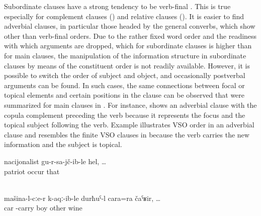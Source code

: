 Subordinate clauses have a strong tendency to be verb-final . This is true especially for complement clauses () and relative clauses (). It is easier to find adverbial clauses, in particular those headed by the general converbs, which show other than verb-final orders. Due to the rather fixed word order and the readiness with which arguments are dropped, which for subordinate clauses is higher than for main clauses, the manipulation of the information structure in subordinate clauses by means of the constituent order is not readily available. However, it is possible to switch the order of subject and object, and occasionally postverbal arguments can be found. In such cases, the same connections between focal or topical elements and certain positions in the clause can be observed that were summarized for main clauses in . For instance,  shows an adverbial clause with the copula complement preceding the verb because it represents the focus and the topical subject following the verb. Example  illustrates VSO order in an adverbial clause and resembles the finite VSO clauses in  because the verb carries the new information and the subject is topical.
%
\begin{exe}
	\ex	\label{ex:‎‎‎That (journalist) was a nationalist}
	\gll	nacijonalist	gu-r-sa-jč-ib-le	hel, \ldots\\
		patriot	occur	that\\
	\glt	{}

	\\\label{ex:‎The boy brought another (bottle of) wine from the car}
	\gll	mašina-l-cːe-r	k-aqː-ib-le	durħuˁ-l	cara=ra	čaˁʁir, \ldots\\
		car	-carry	boy	other	wine\\
	\glt	{}
\end{exe}


